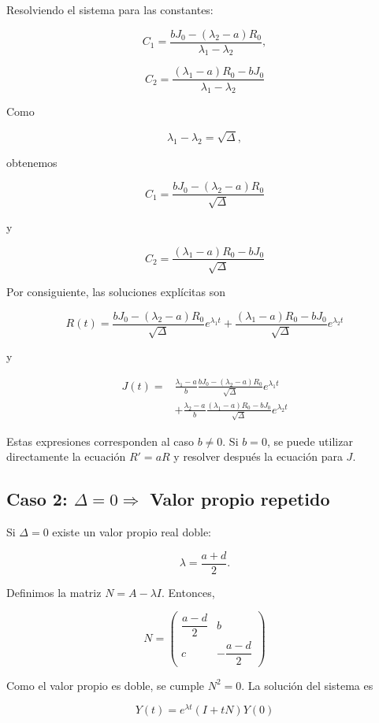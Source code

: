 \documentclass[10pt]{article}
\numberwithin{equation}{section}
\begin{document}
Resolviendo el sistema para las constantes:

\[
C_1=
\frac{bJ_0-(\lambda_2-a)R_0}
{\lambda_1-\lambda_2},
\]

\[
C_2=
\frac{(\lambda_1-a)R_0-bJ_0}
{\lambda_1-\lambda_2}
\]

Como

\[
\lambda_1-\lambda_2=\sqrt{\Delta},
\]

obtenemos

\[
\boxed{
C_1=
\frac{bJ_0-(\lambda_2-a)R_0}
{\sqrt{\Delta}}
}
\]

y

\[
\boxed{
C_2=
\frac{(\lambda_1-a)R_0-bJ_0}
{\sqrt{\Delta}}
}
\]

Por consiguiente, las soluciones explícitas son

\[
\boxed{
R(t)=
\frac{bJ_0-(\lambda_2-a)R_0}{\sqrt{\Delta}}
e^{\lambda_1t}
+
\frac{(\lambda_1-a)R_0-bJ_0}{\sqrt{\Delta}}
e^{\lambda_2t}
}
\]

y

\[
\boxed{
\begin{aligned}
J(t)={}&
\frac{\lambda_1-a}{b}
\frac{bJ_0-(\lambda_2-a)R_0}{\sqrt{\Delta}}
e^{\lambda_1t}\\
&+
\frac{\lambda_2-a}{b}
\frac{(\lambda_1-a)R_0-bJ_0}{\sqrt{\Delta}}
e^{\lambda_2t}
\end{aligned}
}
\]

Estas expresiones corresponden al caso $b\neq 0$. Si $b=0$, se puede utilizar directamente la ecuación
$R'=aR$ y resolver después la ecuación para $J$.
\subsection{Caso 2: $\Delta = 0 \Rightarrow$ Valor propio repetido}

Si $\Delta=0$ existe un valor propio real doble:

\[
\boxed{
\lambda=\frac{a+d}{2}.
}
\]

Definimos la matriz $N=A-\lambda I$. Entonces,

\[
N=
\begin{pmatrix}
\dfrac{a-d}{2}&b\\[4pt]
c&-\dfrac{a-d}{2}
\end{pmatrix}
\]

Como el valor propio es doble, se cumple $N^2=0$. La solución del sistema es

\[
Y(t)=e^{\lambda t}(I+tN)Y(0)
\]
\end{document}
